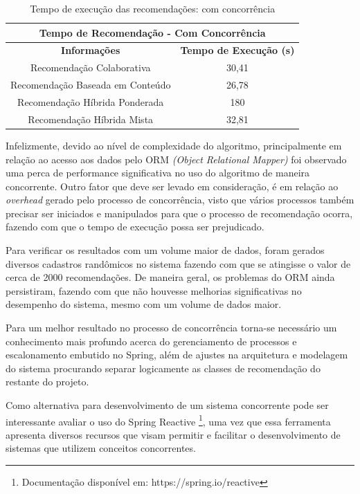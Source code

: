 \begin{table}[H]
\centering
\begin{tabular}{|c|c|}
\hline
\multicolumn{2}{|c|}{\textbf{Tempo de Recomendação - Com Concorrência}} \\ \hline
\textbf{Informações}                 & \textbf{Tempo de Execução (s)}    \\ \hline
Recomendação Colaborativa            & 30,41                              \\ \hline
Recomendação Baseada em Conteúdo     & 26,78                               \\ \hline
Recomendação Híbrida Ponderada       & 180                              \\ \hline
Recomendação Híbrida Mista           & 32,81                              \\ \hline
\end{tabular}
\caption{Tempo de execução das recomendações: com concorrência}
\label{tableref:execucaoRecomendacaoComConcorrencia}
\end{table}

Infelizmente, devido ao nível de complexidade do algoritmo, principalmente em relação ao acesso aos dados pelo ORM \textit{(Object Relational Mapper)} foi observado uma perca de performance significativa no uso do algoritmo de maneira concorrente. Outro fator que deve ser levado em consideração, é em relação ao \textit{overhead} gerado pelo processo de concorrência, visto que vários processos também precisar ser iniciados e manipulados para que o processo de recomendação ocorra, fazendo com que o tempo de execução possa ser prejudicado.

Para verificar os resultados com um volume maior de dados, foram gerados diversos cadastros randômicos no sistema fazendo com que se atingisse o valor de cerca de 2000 recomendações. De maneira geral, os problemas do ORM ainda persistiram, fazendo com que não houvesse melhorias significativas no desempenho do sistema, mesmo com um volume de dados maior.

Para um melhor resultado no processo de concorrência torna-se necessário um conhecimento mais profundo acerca do gerenciamento de processos e escalonamento embutido no Spring, além de ajustes na arquitetura e modelagem do sistema procurando separar logicamente as classes de recomendação do restante do projeto.

Como alternativa para desenvolvimento de um sistema concorrente pode ser interessante avaliar o uso do Spring Reactive \footnote{Documentação disponível em: https://spring.io/reactive}, uma vez que essa ferramenta apresenta diversos recursos que visam permitir e facilitar o desenvolvimento de sistemas que utilizem conceitos concorrentes.


